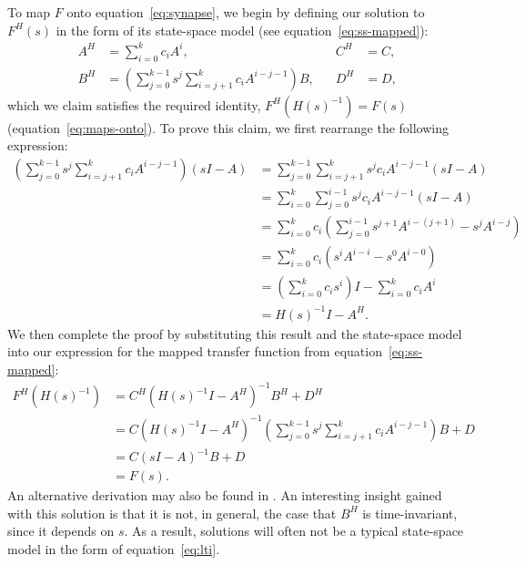 To map $F$ onto equation~\ref{eq:synapse}, we begin by defining our solution to $F^{H}(s)$ in the form of its state-space model (see equation~\ref{eq:ss-mapped}):
\begin{equation} \label{eq:general-linear}
\begin{aligned}
A^H &= \sum_{i=0}^k c_i A^i \text{,} & \quad C^H &= C \text{,} \\
B^H &= \left( \sum_{j=0}^{k-1} s^j \sum_{i=j+1}^k c_i A^{i-j-1} \right) B \text{,} & \quad D^H &= D \text{,}
\end{aligned}
\end{equation}
which we claim satisfies the required identity, $F^{H}(H(s)^{-1}) = F(s)$ (equation~\ref{eq:maps-onto}).
To prove this claim, we first rearrange the following expression:
\begin{align*}
\left( \sum_{j=0}^{k-1} s^j \sum_{i=j+1}^k c_i A^{i-j-1} \right) (sI - A)  &= \sum_{j=0}^{k-1} \sum_{i=j+1}^k s^j c_i A^{i-j-1} (sI - A) \\
&= \sum_{i=0}^{k} \sum_{j=0}^{i-1} s^j c_i A^{i-j-1} (sI - A)  \\
&= \sum_{i=0}^k c_i \left( \sum_{j=0}^{i-1} s^{j+1} A^{i - (j + 1)} - s^j A^{i - j} \right) \\
&= \sum_{i=0}^k c_i \left( s^i A^{i - i} - s^0 A^{i-0} \right) \\
&= \left( \sum_{i=0}^k c_i s^i \right) I - \sum_{i=0}^k c_i A^i \\
&= H(s)^{-1}I - A^H \text{.}
\end{align*}
We then complete the proof by substituting this result and the state-space model into our expression for the mapped transfer function from equation~\ref{eq:ss-mapped}:
\begin{align*}
F^H(H(s)^{-1}) &= C^H(H(s)^{-1}I - A^H)^{-1} B^H + D^H \\
&= C(H(s)^{-1}I - A^H)^{-1} \left( \sum_{j=0}^{k-1} s^j \sum_{i=j+1}^k c_i A^{i-j-1} \right) B + D \\
&= C(sI - A)^{-1} B + D \\
&= F(s) \text{.}
\end{align*}
An alternative derivation may also be found in \citet[][section~2.2]{voelker2017neuromorphic}.
An interesting insight gained with this solution is that it is not, in general, the case that $B^H$ is time-invariant, since it depends on $s$.
As a result, solutions will often not be a typical state-space model in the form of equation~\ref{eq:lti}.

